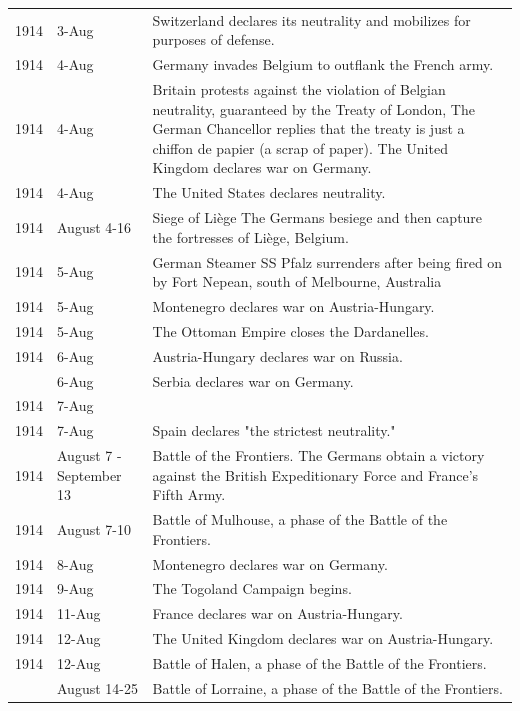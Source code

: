 \documentclass[
  openany]{book}
\begin{document}
\begin{longtable}[t]{rl>{\raggedright\arraybackslash}p{22em}}
\rowcolor{gray!6}  1914 & 3-Aug & Switzerland declares its neutrality and mobilizes for purposes of defense.\\
1914 & 4-Aug & Germany invades Belgium to outflank the French army.\\
\rowcolor{gray!6}  1914 & 4-Aug & Britain protests against the violation of Belgian neutrality, guaranteed by the Treaty of London, The German Chancellor replies that the treaty is just a chiffon de papier (a scrap of paper). The United Kingdom declares war on Germany.\\
1914 & 4-Aug & The United States declares neutrality.\\
\addlinespace
\rowcolor{gray!6}  1914 & August 4-16 & Siege of Liège The Germans besiege and then capture the fortresses of Liège, Belgium.\\
1914 & 5-Aug & German Steamer SS Pfalz surrenders after being fired on by Fort Nepean, south of Melbourne, Australia\\
\rowcolor{gray!6}  1914 & 5-Aug & Montenegro declares war on Austria-Hungary.\\
1914 & 5-Aug & The Ottoman Empire closes the Dardanelles.\\
\rowcolor{gray!6}  1914 & 6-Aug & Austria-Hungary declares war on Russia.\\
\addlinespace
1914 & 6-Aug & Serbia declares war on Germany.\\
\rowcolor{gray!6}  1914 & 7-Aug & \\
1914 & 7-Aug & Spain declares "the strictest neutrality."\\
\rowcolor{gray!6}  1914 & August 7 - September 13 & Battle of the Frontiers. The Germans obtain a victory against the British Expeditionary Force and France's Fifth Army.\\
1914 & August 7-10 & Battle of Mulhouse, a phase of the Battle of the Frontiers.\\
\addlinespace
\rowcolor{gray!6}  1914 & 8-Aug & Montenegro declares war on Germany.\\
1914 & 9-Aug & The Togoland Campaign begins.\\
\rowcolor{gray!6}  1914 & 11-Aug & France declares war on Austria-Hungary.\\
1914 & 12-Aug & The United Kingdom declares war on Austria-Hungary.\\
\rowcolor{gray!6}  1914 & 12-Aug & Battle of Halen, a phase of the Battle of the Frontiers.\\
\addlinespace
1914 & August 14-25 & Battle of Lorraine, a phase of the Battle of the Frontiers.\\

\end{longtable}
\end{document}
